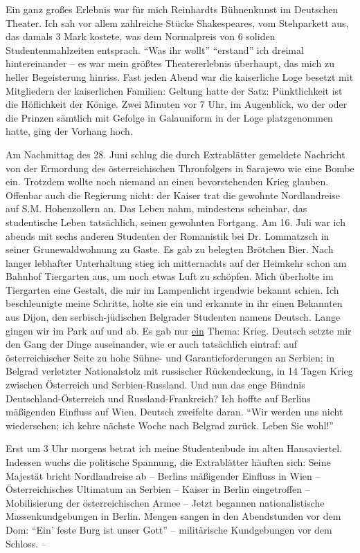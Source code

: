 Ein ganz großes Erlebnis war für mich Reinhardts Bühnenkunst im Deutschen Theater. Ich sah vor allem zahlreiche Stücke Shakespeares, vom Stehparkett aus, das damals 3 Mark kostete, was dem Normalpreis von 6 soliden Studentenmahlzeiten entsprach. \enquote{Was ihr wollt} \enquote{erstand} ich dreimal hintereinander -- es war mein größtes Theatererlebnis überhaupt, das mich zu heller Begeisterung hinriss. Fast jeden Abend war die kaiserliche Loge besetzt mit Mitgliedern der kaiserlichen Familien: Geltung hatte der Satz: Pünktlichkeit ist die Höflichkeit der Könige. Zwei Minuten vor 7 Uhr, im Augenblick, wo der oder die Prinzen sämtlich mit Gefolge in Galauniform in der Loge platzgenommen hatte, ging der Vorhang hoch.

Am Nachmittag des 28. Juni schlug die durch Extrablätter gemeldete Nachricht von der Ermordung des österreichischen Thronfolgers in Sarajewo wie eine Bombe ein. Trotzdem wollte noch niemand an einen bevorstehenden Krieg glauben. Offenbar auch die Regierung nicht: der Kaiser trat die gewohnte Nordlandreise auf S.M. Hohenzollern an. Das Leben nahm, mindestens scheinbar, das studentische Leben tatsächlich, seinen gewohnten Fortgang.
Am 16. Juli war ich abends mit sechs anderen Studenten der Romanistik bei Dr. Lommatzsch in seiner Grunewaldwohnung zu Gaste. Es gab zu belegten Brötchen Bier. Nach langer lebhafter Unterhaltung stieg ich mitternachts auf der Heimkehr schon am Bahnhof Tiergarten aus, um noch etwas Luft zu schöpfen. Mich überholte im Tiergarten eine Gestalt, die mir im Lampenlicht irgendwie bekannt schien. Ich beschleunigte meine Schritte, holte sie ein und erkannte in ihr einen Bekannten aus Dijon, den serbisch-jüdischen Belgrader Studenten namens Deutsch. Lange gingen wir im Park auf und ab. Es gab nur \underline{ein} Thema: Krieg. Deutsch setzte mir den Gang der Dinge auseinander, wie er auch tatsächlich eintraf: auf österreichischer Seite zu hohe Sühne- und Garantieforderungen an Serbien; in Belgrad verletzter Nationalstolz mit russischer Rückendeckung, in 14 Tagen Krieg zwischen Österreich und Serbien-Russland. Und nun das enge Bündnis Deutschland-Österreich und Russland-Frankreich? Ich hoffte auf Berlins mäßigenden Einfluss auf Wien. Deutsch zweifelte daran. \enquote{Wir werden uns nicht wiedersehen; ich kehre nächste Woche nach Belgrad zurück. Leben Sie wohl!}

Erst um 3 Uhr morgens betrat ich meine Studentenbude im alten Hansaviertel. Indessen wuchs die politische Spannung, die Extrablätter häuften sich: Seine Majestät bricht Nordlandreise ab -- Berlins mäßigender Einfluss in Wien -- Österreichisches Ultimatum an Serbien -- Kaiser in Berlin eingetroffen -- Mobilisierung der österreichischen Armee -- Jetzt begannen nationalistische Massenkundgebungen in Berlin. Mengen sangen in den Abendstunden vor dem Dom: \enquote{Ein' feste Burg ist unser Gott} -- militärische Kundgebungen vor dem Schloss. --

